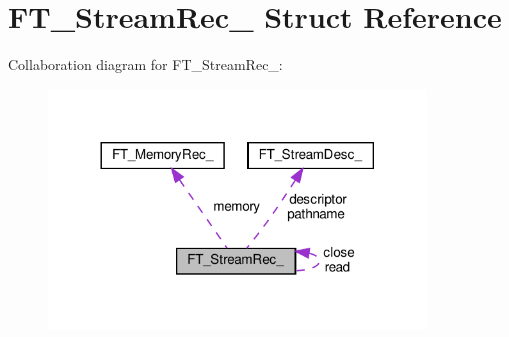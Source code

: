 \hypertarget{structFT__StreamRec__}{}\section{F\+T\+\_\+\+Stream\+Rec\+\_\+ Struct Reference}
\label{structFT__StreamRec__}


Collaboration diagram for F\+T\+\_\+\+Stream\+Rec\+\_\+\+:
\nopagebreak
\begin{figure}[H]
\begin{center}
\leavevmode
\includegraphics[width=284pt]{structFT__StreamRec____coll__graph}
\end{center}
\end{figure}
